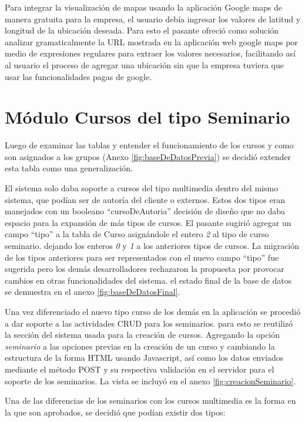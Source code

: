 	Para integrar la visualización de mapas usando la aplicación Google maps de manera gratuita para la empresa, el usuario debía ingresar los valores de latitud y longitud de la ubicación deseada. Para esto el pasante ofreció como solución analizar gramaticalmente la URL mostrada en la aplicación web google maps por medio de expresiones regulares para extraer los valores necesarios, facilitando así al usuario el proceso de agregar una ubicación sin que la empresa tuviera que usar las funcionalidades pagas de google.


	\section{Módulo Cursos del tipo Seminario} %
	\label{sec:cursos_del_tipo_seminario}
	
	Luego de examinar las tablas y entender el funcionamiento de los cursos y como son asignados a los grupos (Anexo \ref{fig:baseDeDatosPrevia}) se decidió extender esta tabla como una generalización.

	El sistema solo daba soporte a cursos del tipo multimedia dentro del mismo sistema, que podían ser de autoría del cliente o externos. Estos dos tipos eran manejados con un booleano ``cursoDeAutoria'' decisión de diseño que no daba espacio para la expansión de más tipos de cursos. El pasante sugirió agregar un campo ``tipo'' a la tabla de Curso asignándole el entero \emph{2} al tipo de curso seminario. dejando los enteros \emph{0} y \emph{1} a los anteriores tipos de cursos. La migración de los tipos anteriores para ser representados con el nuevo campo ``tipo'' fue sugerida pero los demás desarrolladores rechazaron la propuesta por provocar cambios en otras funcionalidades del sistema. el estado final de la base de datos se demuestra en el anexo \ref{fig:baseDeDatosFinal}.

	Una vez diferenciado el nuevo tipo curso de los demás en la aplicación se procedió a dar soporte a las actividades CRUD para los seminarios. para esto se reutilizó la sección del sistema usada para la creación de cursos. Agregando la opción \emph{seminario} a las opciones previas en la creación de un curso y cambiando la estructura de la forma HTML usando Javascript, así como los datos enviados mediante el método POST y su respectiva validación en el servidor para el soporte de los seminarios. La vista se incluyó en el anexo \ref{fig:creacionSeminario}.

	Una de las diferencias de los seminarios con los cursos multimedia es la forma en la que son aprobados, se decidió que podían existir dos tipos:

